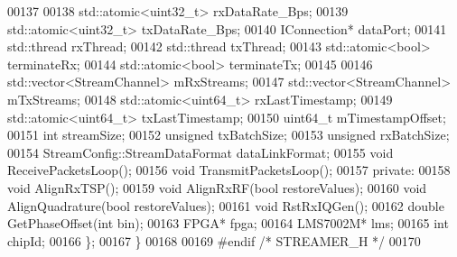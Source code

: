 \begin{DoxyCode}
00137 
00138     std::atomic<uint32\_t> rxDataRate_Bps;
00139     std::atomic<uint32\_t> txDataRate_Bps;
00140     IConnection* dataPort;
00141     std::thread rxThread;
00142     std::thread txThread;
00143     std::atomic<bool> terminateRx;
00144     std::atomic<bool> terminateTx;
00145 
00146     std::vector<StreamChannel> mRxStreams;
00147     std::vector<StreamChannel> mTxStreams;
00148     std::atomic<uint64\_t> rxLastTimestamp;
00149     std::atomic<uint64\_t> txLastTimestamp;
00150     uint64\_t mTimestampOffset;
00151     \textcolor{keywordtype}{int} streamSize;
00152     \textcolor{keywordtype}{unsigned} txBatchSize;
00153     \textcolor{keywordtype}{unsigned} rxBatchSize;
00154     StreamConfig::StreamDataFormat dataLinkFormat;
00155     \textcolor{keywordtype}{void} ReceivePacketsLoop();
00156     \textcolor{keywordtype}{void} TransmitPacketsLoop();
00157 \textcolor{keyword}{private}:
00158     \textcolor{keywordtype}{void} AlignRxTSP();
00159     \textcolor{keywordtype}{void} AlignRxRF(\textcolor{keywordtype}{bool} restoreValues);
00160     \textcolor{keywordtype}{void} AlignQuadrature(\textcolor{keywordtype}{bool} restoreValues);
00161     \textcolor{keywordtype}{void} RstRxIQGen();
00162     \textcolor{keywordtype}{double} GetPhaseOffset(\textcolor{keywordtype}{int} bin);
00163     FPGA* fpga;
00164     LMS7002M* lms;
00165     \textcolor{keywordtype}{int} chipId;
00166 \};
00167 \}
00168 
00169 \textcolor{preprocessor}{#endif }\textcolor{comment}{/* STREAMER\_H */}\textcolor{preprocessor}{}
00170 
\end{DoxyCode}
